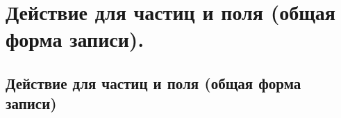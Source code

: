 \chapter{Действие для частиц и поля (общая форма записи).}

\section{Действие для частиц и поля (общая форма записи)}
